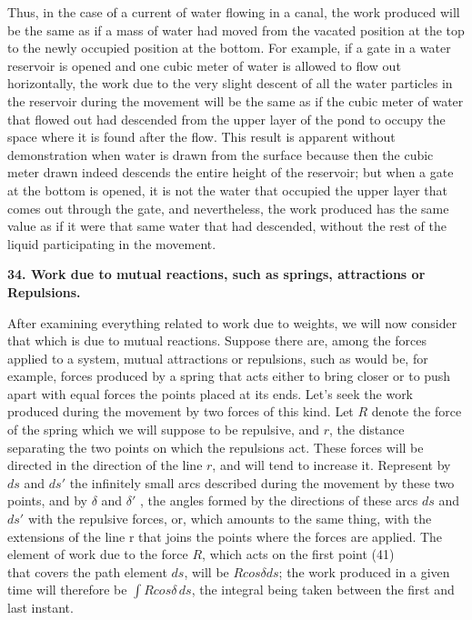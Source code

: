 \documentclass{book}
\begin{document}
Thus, in the case of a current of water flowing in a canal, the work produced will be the same as if a mass of water had moved from the vacated position at the top to the newly occupied position at the bottom. For example, if a gate in a water reservoir is opened and one cubic meter of water is allowed to flow out horizontally, the work due to the very slight descent of all the water particles in the reservoir during the movement will be the same as if the cubic meter of water that flowed out had descended from the upper layer of the pond to occupy the space where it is found after the flow. This result is apparent without demonstration when water is drawn from the surface because then the cubic meter drawn indeed descends the entire height of the reservoir; but when a gate at the bottom is opened, it is not the water that occupied the upper layer that comes out through the gate, and nevertheless, the work produced has the same value as if it were that same water that had descended, without the rest of the liquid participating in the movement.


\vspace{4mm}
\textbf{34. Work due to mutual reactions, such as springs, attractions or Repulsions.}

\vspace{4mm} %




After examining everything related to work due to weights, we will now consider that which is due to mutual reactions.
Suppose there are, among the forces applied to a system, mutual attractions or repulsions, such as would be, for example, forces produced by a spring that acts either to bring closer or to push apart with equal forces the points placed at its ends. Let's seek the work produced during the movement by two forces of this kind.
Let \(R\) denote the force of the spring which we will suppose to be repulsive, and \(r\), the distance separating the two points on which the repulsions act. These forces will be directed in the direction of the line \(r\), and will tend to increase it. Represent by \(ds\) and \(ds'\) the infinitely small arcs described during the movement by these two points, and by \(\delta\) and \(\delta'\) , the angles formed by the directions of these arcs \(ds\) and \(ds'\) with the repulsive forces, or, which amounts to the same thing, with the extensions of the line r that joins the points where the forces are applied.
The element of work due to the force \(R\), which acts on the first point
\newpage
(41)\\
that covers the path element \(ds\), will be \(Rcos \delta ds\); the work produced in a given time will therefore be \( \int Rcos \delta\,ds\), the integral being taken between the first and last instant.
\end{document}
